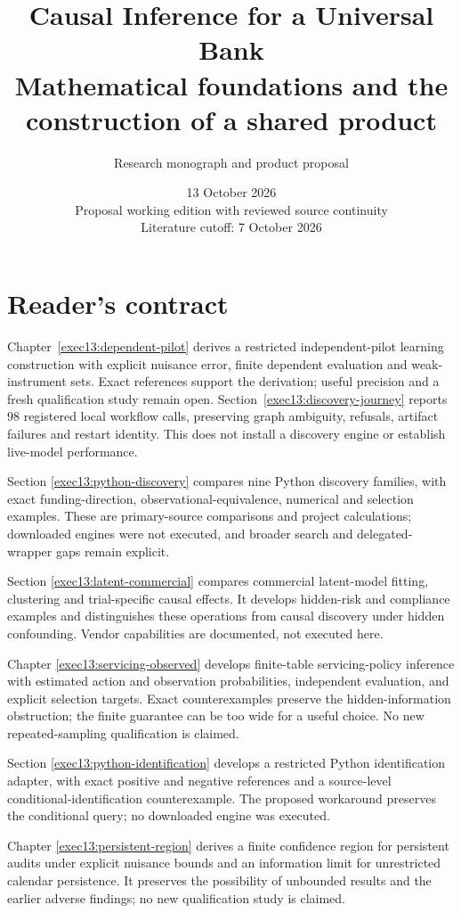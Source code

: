\documentclass[11pt,a4paper,openany]{book}
\title{\sffamily\bfseries\color{ink}Causal Inference for a Universal Bank\\[14pt]
\Large Mathematical foundations and the construction of a shared product}
\author{Research monograph and product proposal}
\date{13 October 2026\\Proposal working edition with reviewed source continuity\\Literature cutoff: 7 October 2026}
\begin{document}
\frontmatter
\maketitle
\chapter*{Reader's contract}

Chapter~\ref{exec13:dependent-pilot} derives a restricted independent-pilot
learning construction with explicit nuisance error, finite dependent evaluation
and weak-instrument sets. Exact references support the derivation; useful
precision and a fresh qualification study remain open.
Section~\ref{exec13:discovery-journey} reports 98 registered local workflow
calls, preserving graph ambiguity, refusals, artifact failures and restart
identity. This does not install a discovery engine or establish live-model performance.


Section \ref{exec13:python-discovery} compares nine Python discovery families,
with exact funding-direction, observational-equivalence, numerical and selection examples.
These are primary-source comparisons and project calculations; downloaded engines
were not executed, and broader search and delegated-wrapper gaps remain explicit.


Section \ref{exec13:latent-commercial} compares commercial latent-model fitting,
clustering and trial-specific causal effects. It develops hidden-risk and
compliance examples and distinguishes these operations from causal discovery
under hidden confounding. Vendor capabilities are documented, not executed here.


Chapter \ref{exec13:servicing-observed} develops finite-table servicing-policy
inference with estimated action and observation probabilities, independent
evaluation, and explicit selection targets. Exact counterexamples preserve
the hidden-information obstruction; the finite guarantee can be too wide
for a useful choice. No new repeated-sampling qualification is claimed.


Section \ref{exec13:python-identification} develops a restricted Python
identification adapter, with exact positive and negative references and a
source-level conditional-identification counterexample. The proposed workaround
preserves the conditional query; no downloaded engine was executed.


Chapter \ref{exec13:persistent-region} derives a finite confidence region for
persistent audits under explicit nuisance bounds and an information limit for
unrestricted calendar persistence. It preserves the possibility of unbounded
results and the earlier adverse findings; no new qualification study is claimed.
\end{document}
